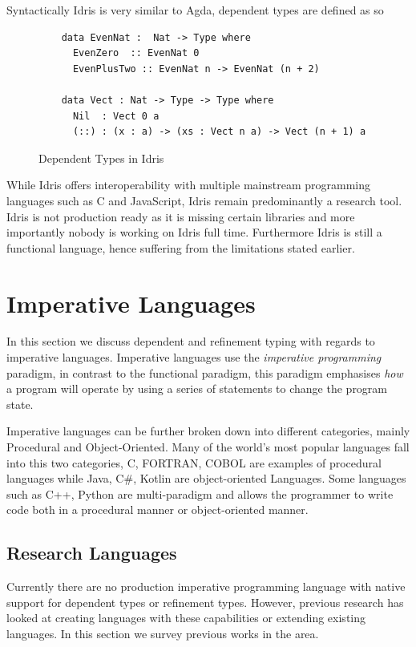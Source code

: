 \documentclass[a4paper,12pt]{report}
\begin{document}
\par
Syntactically Idris is very similar to Agda, dependent types are defined as so 
 
\begin{figure}[H]
  \begin{lstlisting}      
    data EvenNat :  Nat -> Type where
      EvenZero  :: EvenNat 0
      EvenPlusTwo :: EvenNat n -> EvenNat (n + 2)
      
    data Vect : Nat -> Type -> Type where
      Nil  : Vect 0 a
      (::) : (x : a) -> (xs : Vect n a) -> Vect (n + 1) a
  \end{lstlisting}
  \caption{Dependent Types in Idris}
\end{figure}

\par
While Idris offers interoperability with multiple mainstream programming 
languages such as C and JavaScript, Idris remain predominantly a research tool. 
Idris is not production ready \cite{gpIdris} as it is missing certain libraries 
and more importantly nobody is working on Idris full time. Furthermore Idris is 
still a functional language, hence suffering from the limitations stated earlier. 

\section{Imperative Languages}
In this section we discuss dependent and refinement typing with regards to imperative 
languages. Imperative languages use the \textit{imperative programming} 
\cite{imperativeOverview} paradigm, in contrast to the functional 
paradigm, this paradigm emphasises \textit{how} a program will operate 
by using a series of statements to change the program state.

\par
Imperative languages can be further broken down into different categories, 
mainly Procedural and Object-Oriented. Many of the world's most popular languages 
fall into this two categories, C, FORTRAN, COBOL are examples of procedural 
languages while Java, C#, Kotlin are object-oriented Languages. Some languages such 
as C++, Python are multi-paradigm and allows the programmer to write code both 
in a procedural manner or object-oriented manner. 

\subsection{Research Languages}
Currently there are no production imperative programming language with 
native support for dependent types or refinement types. 
However, previous research has looked at creating languages with these 
capabilities or extending existing languages. In this section we survey 
previous works in the area. 
\end{document}
